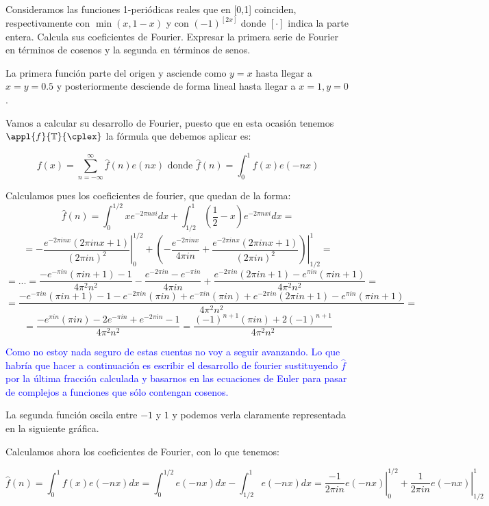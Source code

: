 \begin{problem}[3]

	Consideramos las funciones 1-periódicas reales que en [0,1] coinciden, respectivamente con $\min(x,1-x)$ y con $(-1)^{[2x]}$ donde $[\cdot ]$ indica la parte entera. Calcula sus coeficientes de Fourier. Expresar la primera serie de Fourier en términos de cosenos y la segunda en términos de senos.
	\solution


	La primera función parte del origen y asciende como $y=x$ hasta llegar a $x=y=0.5$ y posteriormente desciende de forma lineal hasta llegar a $x=1, y=0$.


	Vamos a calcular su desarrollo de Fourier, puesto que en esta ocasión tenemos $\appl{f}{\mathbb{T}}{\cplex}$ la fórmula que debemos aplicar es:

	\[f(x)=\sum_{n=-\infty}^{\infty} \hat{f}(n)e(nx) \text{ donde } \hat{f}(n)=\int_0^1 f(x)e(-nx)\]

	Calculamos pues los coeficientes de fourier, que quedan de la forma:
	\[\hat{f}(n)=\int_0^{1/2} x e^{-2πnxi}dx+\int_{1/2}^1 \left(\frac{1}{2}-x\right)e^{-2πnxi}dx= \]
	\[=\left. -\frac{e^{-2πinx}(2πinx+1)}{(2πin)^2}\right|_0^{1/2} + \left. \left(- \frac{e^{-2πinx}}{4πin}+\frac{e^{-2πinx}(2πinx+1)}{(2πin)^2}\right) \right|_{1/2}^1 = \]
	\[=...=\frac{-e^{-πin}(πin+1)-1}{4π^2n^2}-\frac{e^{-2πin}-e^{-πin}}{4πin}+\frac{e^{-2πin}(2πin+1)-e^{πin}(πin+1)}{4π^2n^2}=\]
	\[=\frac{-e^{-πin}(πin+1)-1-e^{-2πin}(πin)+e^{-πin}(πin)+e^{-2πin}(2πin+1)-e^{πin}(πin+1)}{4π^2n^2}=\]
	\[=\frac{-e^{πin}(πin)-2e^{-πin}+e^{-2πin}-1}{4π^2n^2}=\frac{(-1)^{n+1}(πin)+2(-1)^{n+1}}{4π^2n^2}\]

	\textcolor{blue}{Como no estoy nada seguro de estas cuentas no voy a seguir avanzando. Lo que habría que hacer a continuación es escribir el desarrollo de fourier sustituyendo $\hat{f}$ por la última fracción calculada y basarnos en las ecuaciones de Euler para pasar de complejos a funciones que sólo contengan cosenos.}

	La segunda función oscila entre $-1$ y $1$ y podemos verla claramente representada en la siguiente gráfica.
	\begin{center}
	\end{center}

	Calculamos ahora los coeficientes de Fourier, con lo que tenemos:

	$$ \hat{f}(n) = \int^{1}_{0} f(x) e(-nx)dx = \int^{1/2}_{0} e(-nx)dx - \int^{1}_{1/2} e(-nx) dx =  \left.\frac{-1}{2 \pi i n} e(-nx) \right|^{1/2}_{0} +\left. \frac{1}{2 \pi i n} e(-nx)  \right|^{1}_{1/2} $$


\end{problem}
